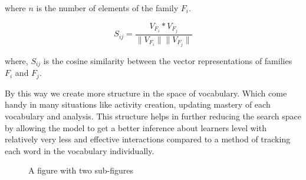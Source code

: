 \documentclass[11pt,a4paper]{article}
\begin{document}
where ${n}$ is the number of elements of the family ${F_i}$.

\begin{equation}
  S_{ij} = \frac{V_{F_i} * V_{F_j}}{\|V_{F_i}\|  \|V_{F_j}\|}
\end{equation}

where, ${S_{ij}}$ is the cosine similarity between the vector representations of
families ${F_i}$ and ${F_j}$.


By this way we create more structure in the space of vocabulary. Which come
handy in many situations like activity creation, updating mastery of each
vocabulary and analysis. This structure helps in further reducing the search space
by allowing the model to get a better inference about learners level with
relatively very less and effective interactions compared to a method of
tracking each word in the vocabulary individually.


\begin{figure}[hbt!]
  \centering
  \hspace{0mm}
  \caption{A figure with two sub-figures}
  \label{fig:network}
\end{figure}
\end{document}
